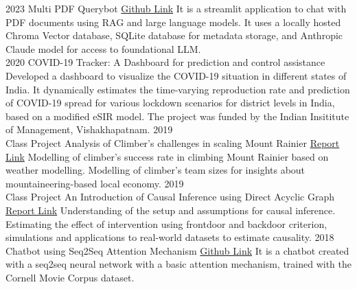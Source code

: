 \documentclass[10pt]{developercv} %
\begin{document}
\begin{entrylist}
    \vspace{-10pt}
    \entry
    {2023}
    {Multi PDF Querybot}
    {\href{https://github.com/subroy13/multi-pdf-querybot}{Github Link}}
    {\small It is a streamlit application to chat with PDF documents using RAG and large language models. It uses a locally hosted Chroma Vector database, SQLite database for metadata storage, and Anthropic Claude model for access to foundational LLM.}
    \vspace{-5pt}\\
    \entry
    {2020}
    {COVID-19 Tracker: A Dashboard for prediction and control assistance}
    {}
    {\small Developed a dashboard to visualize the COVID-19 situation in different states of India. It dynamically estimates the time-varying reproduction rate and prediction of COVID-19 spread for various lockdown scenarios for district levels in India, based on a modified eSIR model. The project was funded by the Indian Insititute of Management, Vishakhapatnam.}
    \entry
    {2019\\Class Project}
    {Analysis of Climber's challenges in scaling Mount Rainier}
    {\href{https://github.com/subroy13/mount-rainier-case-study}{Report Link} }
    {\small Modelling of climber's success rate in climbing Mount Rainier based on weather modelling. Modelling of climber's team sizes for insights about mountaineering-based local economy.}
    \entry
    {2019\\Class Project}
    {An Introduction of Causal Inference using Direct Acyclic Graph}
    {\href{https://www.statwizard.in/aboutme/causal-dag/final-report.pdf}{Report Link} }
    {\small Understanding of the setup and assumptions for causal inference. Estimating the effect of intervention using frontdoor and backdoor criterion, simulations and applications to real-world datasets to estimate causality.}
    \entry
    {2018}
    {Chatbot using Seq2Seq Attention Mechanism}
    {\href{https://github.com/subroy13/seq2seq-attention-bot}{Github Link}}
    {\small It is a chatbot created with a seq2seq neural network with a basic attention mechanism, trained with the Cornell Movie Corpus dataset.}
\end{entrylist}

\end{document}
